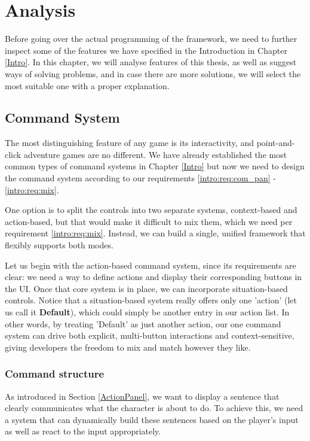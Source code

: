 \chapter{Analysis}

Before going over the actual programming of the framework, we need to further inspect some of the features we have specified in the Introduction in Chapter \ref{Intro}. In this chapter, we will analyse features of this thesis, as well as suggest ways of solving problems, and in case there are more solutions, we will select the most suitable one with a proper explanation.

\section{Command System}
The most distinguishing feature of any game is its interactivity, and point-and-click adventure games are no different. We have already established the most common types of command systems in Chapter \ref{Intro} but now we need to design the command system according to our requirements \ref{intro:req:com_pan} - \ref{intro:req:mix}. 

One option is to split the controls into two separate systems, context-based and action-based, but that would make it difficult to mix them, which we need per requirement \ref{intro:req:mix}. Instead, we can build a single, unified framework that flexibly supports both modes.

Let us begin with the action-based command system, since its requirements are clear: we need a way to define actions and display their corresponding buttons in the UI. Once that core system is in place, we can incorporate situation-based controls. Notice that a situation-based system really offers only one 'action' (let us call it \textbf{Default}), which could simply be another entry in our action list. In other words, by treating 'Default' as just another action, our one command system can drive both explicit, multi-button interactions and context-sensitive, giving developers the freedom to mix and match however they like.

\subsection{Command structure}
As introduced in Section \ref{ActionPanel}, we want to display a sentence that clearly communicates what the character is about to do. To achieve this, we need a system that can dynamically build these sentences based on the player's input as well as react to the input appropriately.

